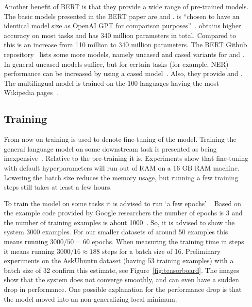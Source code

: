Another benefit of BERT is that they provide a wide range of pre-trained models.
The basic models presented in the BERT paper are  and .
 is ``chosen to have an identical model size as OpenAI GPT for comparison purposes''~\citep{devlin2018}.
 obtains higher accuracy on most tasks and has 340 million parameters in total.
Compared to  this is an increase from 110 million to 340 million parameters.
The BERT Github repository~\citep{devlin2018github} lists some more models, namely uncased and cased variants for  and .
In general uncased models suffice, but for certain tasks (for example, NER) performance can be increased by using a cased model~\citep{devlin2018github}.
Also, they provide  and .
The multilingual model is trained on the 100 languages having the most Wikipedia pages~\citep{devlin2019multi}.

\subsection{Training}
\label{subsec:training}
From now on training is used to denote fine-tuning of the model.
Training the general language model on some downstream task is presented as being inexpensive~\citep{devlin2018github}.
Relative to the pre-training it is.
Experiments show that fine-tuning with default hyperparameters will run out of RAM on a 16 GB RAM machine.
Lowering the batch size reduces the memory usage, but running a few training steps still takes at least a few hours.

To train the model on some tasks it is advised to run `a few epochs'~\citep{devlin2018github}.
Based on the example code provided by Google researchers the number of epochs is 3 and the number of training examples is about 1000~\citep{bajaj2018}.
So, it is advised to show the system $3000$ examples.
For our smaller datasets of around 50 examples this means running $3000 / 50 = 60$ epochs.
When measuring the training time in steps it means running $3000 / 16 \approx 188$ steps for a batch size of 16.
Preliminary experiments on the AskUbuntu dataset (having 53 training examples) with a batch size of 32 confirm this estimate, see Figure~\ref{fig:tensorboard}.
The images show that the system does not converge smoothly, and can even have a sudden drop in performance.
One possible explanation for the performance drop is that the model moved into an non-generalizing local minimum.

